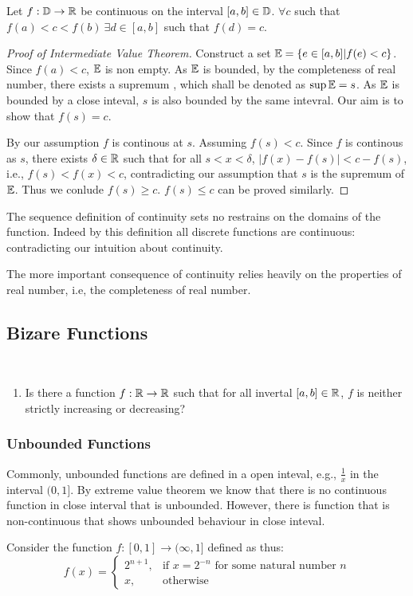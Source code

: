 \documentclass[../note.tex]{subfiles}
\begin{document}
\begin{theorem}
	Let $f: \mathbb{D} \rightarrow \mathbb{R}$ be continuous on the interval $[a,b]\in \mathbb{D}$. $\forall c $ such that $f(a)<c<f(b)\ \exists d \in [a,b] $ such that $ f(d) = c$.  
\end{theorem}

\begin{proof}[Proof of Intermediate Value Theorem]
	Construct a set $\mathbb{E} = \{e\in [a,b]| f(e)<c\}$. Since $f(a)<c$, $\mathbb{E}$ is non empty.  
	As $\mathbb{E}$ is bounded, by the completeness of real number, there exists a supremum , which shall be denoted as $\sup{\mathbb{E}}=s$. 
	As $\mathbb{E}$ is bounded by a close inteval, $s$ is also bounded by the same intevral. Our aim is to show that $f(s)=c$.

	By our assumption $f$ is continous at $s$. Assuming $f(s) < c$. 
	Since $f$ is continous as $s$, there exists $\delta \in \mathbb{R}$ such that for all $s<x<\delta$, $|f(x)-f(s)|<c-f(s)$, i.e., $f(s)<f(x)<c$, contradicting our assumption that $s$ is the supremum of $\mathbb{E}$. 
	Thus we conlude $f(s)\geq c$. $f(s)\leq c$ can be proved similarly.
\end{proof}

\begin{remark}
	The sequence definition of continuity sets no restrains on the domains of the function. Indeed by this definition all discrete functions are continuous: contradicting our intuition about continuity.
	
	The more important consequence of continuity relies heavily on the properties of real number, i.e, the completeness of real number.
\end{remark}

\subsection{Bizare Functions}
\begin{hypothesis}
	\ 
\begin{enumerate}
	\item Is there a function $f: \mathbb{R} \rightarrow \mathbb{R}$ such that for all invertal $[a,b] \in \mathbb{R}$, $f$ is neither strictly increasing or decreasing? 

\end{enumerate}
\end{hypothesis}
\subsubsection{Unbounded Functions}
Commonly, unbounded functions are defined in a open inteval, e.g., $\frac{1}{x}$ in the interval $(0, 1]$. By extreme value theorem we know that there is no continuous function in close interval that is unbounded. However, there is function that is non-continuous that shows unbounded behaviour in close inteval.

Consider the function $f:[0,1] \rightarrow (\infty, 1]$ defined as thus:
		\[
    f(x)= 
\begin{cases}
	2^{n+1},& \text{if } x=2^{-n} \text{ for some natural number }n\\
    x,              & \text{otherwise}
\end{cases}
\]
\end{document}
